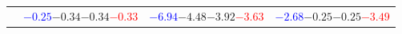 \documentclass[compress]{beamer}
\begin{document}
\begin{frame}
\begin{tabular}{r | c | c | c}
          & \textcolor{blue}{$-0.25$}\hspace{0.1 cm}$-0.34$\hspace{0.1 cm}$-0.34$\hspace{0.1 cm}\textcolor{red}{$-0.33$} & \textcolor{blue}{$-6.94$}\hspace{0.1 cm}$-4.48$\hspace{0.1 cm}$-3.92$\hspace{0.1 cm}\textcolor{red}{$-3.63$} & \textcolor{blue}{$-2.68$}\hspace{0.1 cm}$-0.25$\hspace{0.1 cm}$-0.25$\hspace{0.1 cm}\textcolor{red}{$-3.49$} \\
\end{tabular}
\end{frame}
\end{document}
